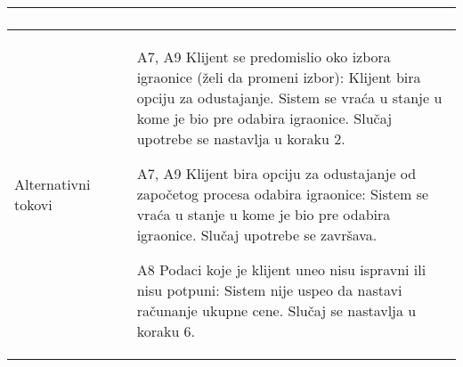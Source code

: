 \documentclass[../../main.tex]{subfiles}
\begin{document}
\begin{longtable}{| p{} | p{} |}
\begin{enumerate}
    \end{enumerate}\\
\hline
    Alternativni tokovi & 
    \begin{itemize}
        \item [A7, A9] Klijent se predomislio oko izbora igraonice (želi da promeni izbor): Klijent bira opciju za odustajanje. Sistem se vraća u stanje u kome je bio pre odabira igraonice. Slučaj upotrebe se nastavlja u koraku 2.
        \item[A7, A9] Klijent bira opciju za odustajanje od započetog procesa odabira igraonice: Sistem se vraća u stanje u kome je bio pre odabira igraonice. Slučaj upotrebe se završava.
        \item[A8] Podaci koje je klijent uneo nisu ispravni ili nisu potpuni: Sistem nije uspeo da nastavi računanje ukupne cene. Slučaj se nastavlja u koraku 6.
        

\end{itemize}
\end{longtable}
\end{document}
